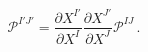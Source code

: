 \begin{equation}
\mathcal{P}^{I'J'}=\frac{\partial X^{I'}}{\partial X^I}
\frac{\partial X^{J'}}{\partial X^J}
\mathcal{P}^{IJ}\,. \label{calP}
\end{equation}

